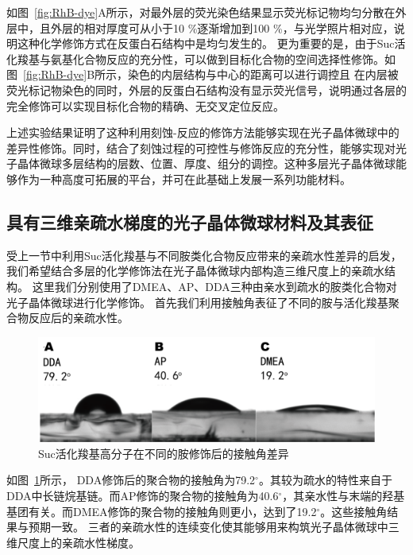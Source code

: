 如图~\ref{fig:RhB-dye}A所示，对最外层的荧光染色结果显示荧光标记物均匀分散在外层中，且外层的相对厚度可从小于10 \%逐渐增加到100 \%，与光学照片相对应，说明这种化学修饰方式在反蛋白石结构中是均匀发生的。
更为重要的是，由于Suc活化羧基与氨基化合物反应的充分性，可以做到目标化合物的空间选择性修饰。如图~\ref{fig:RhB-dye}B所示，染色的内层结构与中心的距离可以进行调控且
在内层被荧光标记物染色的同时，外层的反蛋白石结构没有显示荧光信号，说明通过各层的完全修饰可以实现目标化合物的精确、无交叉定位反应。

上述实验结果证明了这种利用刻蚀-反应的修饰方法能够实现在光子晶体微球中的差异性修饰。同时，结合了刻蚀过程的可控性与修饰反应的充分性，能够实现对光子晶体微球多层结构的层数、位置、厚度、组分的调控。这种多层光子晶体微球能够作为一种高度可拓展的平台，并可在此基础上发展一系列功能材料。

\subsection{具有三维亲疏水梯度的光子晶体微球材料及其表征}

受上一节中利用Suc活化羧基与不同胺类化合物反应带来的亲疏水性差异的启发，我们希望结合多层的化学修饰法在光子晶体微球内部构造三维尺度上的亲疏水结构。
这里我们分别使用了DMEA、AP、DDA三种由亲水到疏水的胺类化合物对光子晶体微球进行化学修饰。
首先我们利用接触角表征了不同的胺与活化羧基聚合物反应后的亲疏水性。
\begin{figure}[htbp]
  \centering
  \includegraphics[width=\linewidth]{figures/ch5/ch5-CA.png}
  \caption{Suc活化羧基高分子在不同的胺修饰后的接触角差异}
  \label{fig:ch5-CA}
\end{figure}

如图~\ref{fig:ch5-CA}所示，
DDA修饰后的聚合物的接触角为79.2$^\circ$。其较为疏水的特性来自于DDA中长链烷基链。而AP修饰的聚合物的接触角为40.6$^\circ$，其亲水性与末端的羟基基团有关。而DMEA修饰的聚合物的接触角则更小，达到了19.2$^\circ$。这些接触角结果与预期一致。
三者的亲疏水性的连续变化使其能够用来构筑光子晶体微球中三维尺度上的亲疏水性梯度。

